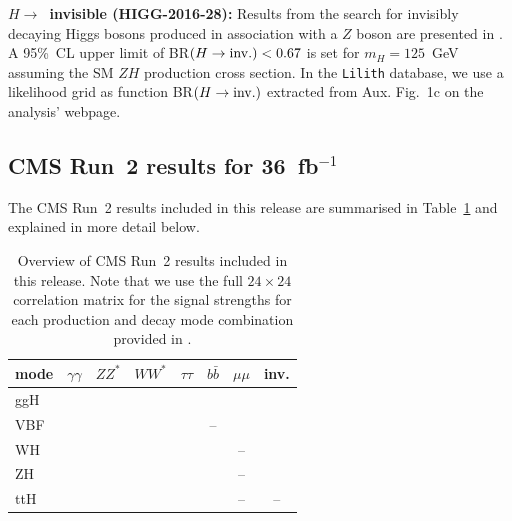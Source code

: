 {\bf\boldmath $H\to$~invisible (HIGG-2016-28):} 
Results from the search for invisibly decaying Higgs bosons produced in association with a $Z$ boson are presented in \cite{Aaboud:2017bja}. 
A 95\%~CL upper limit of BR$(H\to {\rm inv.})<0.67$ is set for $m_H= 125$~GeV assuming the SM $ZH$ production cross section. 
In the {\tt Lilith} database, 
we use a likelihood grid as function BR$(H\to {\rm inv.})$ extracted from Aux. Fig.~1c on the analysis' webpage. \\



\subsection{CMS Run~2 results for 36~fb$^{-1}$}

The CMS Run~2 results included in this release are summarised in Table~\ref{tab:CMSresults} and explained in more detail below.

\begin{table}[h]\centering
\begin{tabular}{l | ccccccc}
mode & $\gamma\gamma$ & $ZZ^*$ & $WW^*$ & $\tau\tau$ & $b\bar b$ & $\mu\mu$ & inv. \\
\hline
ggH & \cite{Sirunyan:2018koj} & \cite{Sirunyan:2018koj} & \cite{Sirunyan:2018koj} & \cite{Sirunyan:2018koj} & \cite{Sirunyan:2018koj} & \cite{Sirunyan:2018koj} & \cite{Sirunyan:2018owy} \\
VBF &  \cite{Sirunyan:2018koj} & \cite{Sirunyan:2018koj} & \cite{Sirunyan:2018koj} & \cite{Sirunyan:2018koj} &-- & \cite{Sirunyan:2018koj} & \cite{Sirunyan:2018owy} \\
WH &  \cite{Sirunyan:2018koj} & \cite{Sirunyan:2018koj} & \cite{Sirunyan:2018koj} & \cite{Sirunyan:2018cpi} & \cite{Sirunyan:2018koj} & -- & \cite{Sirunyan:2018owy} \\
ZH & \cite{Sirunyan:2018koj} & \cite{Sirunyan:2018koj} & \cite{Sirunyan:2018koj} & \cite{Sirunyan:2018cpi} & \cite{Sirunyan:2018koj} & -- & \cite{Sirunyan:2018owy} \\
ttH & \cite{Sirunyan:2018koj} & \cite{Sirunyan:2018koj} & \cite{Sirunyan:2018koj} & \cite{Sirunyan:2018koj} & \cite{Sirunyan:2018koj} & -- & -- \\
\end{tabular}
\caption{Overview of CMS Run~2 results included in this release. Note that we use the full $24\times 24$ correlation matrix 
for the signal strengths for each production and decay mode combination provided in \cite{Sirunyan:2018koj}.}
\label{tab:CMSresults}
\end{table}


